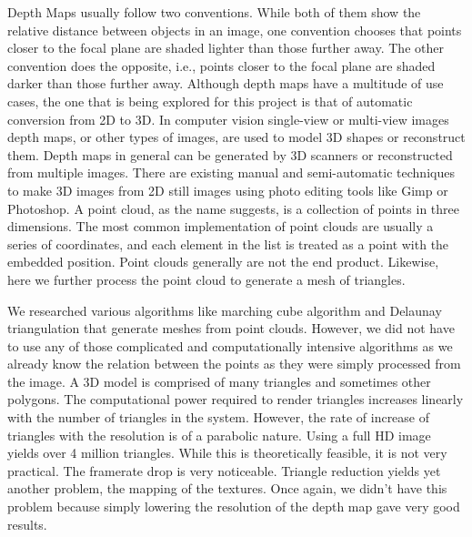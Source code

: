 \documentclass{article}
\begin{document}
Depth Maps usually follow two conventions. While both of them show the relative distance between objects in an image, one convention chooses that points closer to the focal plane are shaded lighter than those further away. The other convention does the opposite, i.e., points closer to the focal plane are shaded darker than those further away.
Although depth maps have a multitude of use cases, the one that is being explored for this project is that of automatic conversion from 2D to 3D. In computer vision single-view or multi-view images depth maps, or other types of images, are used to model 3D shapes or reconstruct them. Depth maps in general can be generated by 3D scanners or reconstructed from multiple images.
There are existing manual and semi-automatic techniques to make 3D images from 2D still images using photo editing tools like Gimp or Photoshop.
A point cloud, as the name suggests, is a collection of points in three dimensions. The most common implementation of point clouds are usually a series of coordinates, and each element in the list is treated as a point with the embedded position. Point clouds generally are not the end product. Likewise, here we further process the point cloud to generate a mesh of triangles.

We researched various algorithms like marching cube algorithm and Delaunay triangulation that generate meshes from point clouds. However, we did not have to use any of those complicated and computationally intensive algorithms as we already know the relation between the points as they were simply processed from the image.
A 3D model is comprised of many triangles and sometimes other polygons. The computational power required to render triangles increases linearly with the number of triangles in the system. However, the rate of increase of triangles with the resolution is of a parabolic nature. Using a full HD image yields over 4 million triangles. While this is theoretically feasible, it is not very practical. The framerate drop is very noticeable. Triangle reduction yields yet another problem, the mapping of the textures. Once again, we didn’t have this problem because simply lowering the resolution of the depth map gave very good results.
    
\end{document}
